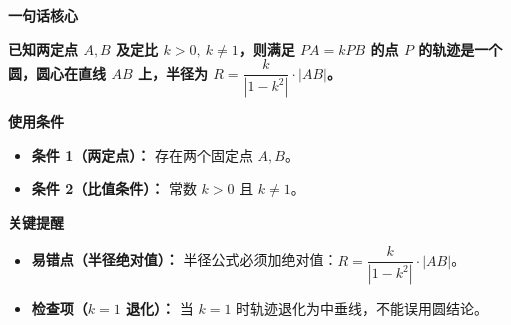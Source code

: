 \begin{summarybox}
	\textbf{\textcolor{CSummary}{一句话核心}}

	\textbf{已知两定点 $A,B$ 及定比 $k>0,\ k\neq 1$，则满足 $PA=kPB$ 的点 $P$ 的轨迹是一个圆，圆心在直线 $AB$ 上，半径为 $R=\dfrac{k}{|1-k^2|}\cdot |AB|$。}

	\medskip
	\textbf{\textcolor{CSummary}{使用条件}}
	\begin{itemize}[leftmargin=*, itemsep=0.5em, topsep=0.4em]
		\item \textbf{条件 1（两定点）：} 存在两个固定点 $A,B$。
		\item \textbf{条件 2（比值条件）：} 常数 $k>0$ 且 $k\neq 1$。
	\end{itemize}

	\medskip
	\textbf{\textcolor{CSummary}{关键提醒}}
	\begin{itemize}[leftmargin=*, itemsep=0.5em, topsep=0.4em]
		\item \textbf{易错点（半径绝对值）：} 半径公式必须加绝对值：$R=\dfrac{k}{|1-k^2|}\cdot |AB|$。
		\item \textbf{检查项（$k=1$ 退化）：} 当 $k=1$ 时轨迹退化为中垂线，不能误用圆结论。
	\end{itemize}
\end{summarybox}